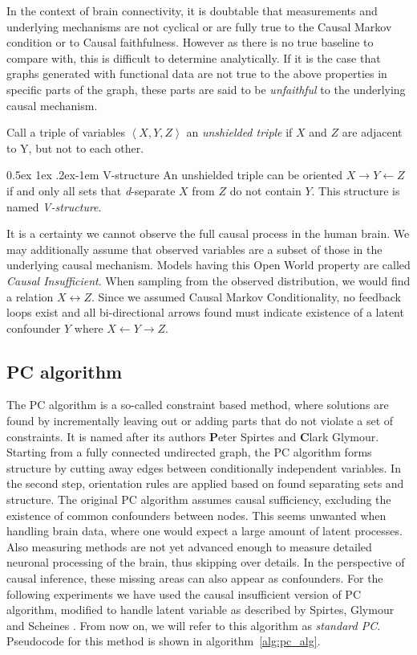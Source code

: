 \documentclass[a4paper, 10pt, english, onecolumn]{article}
\makeatletter
\renewcommand{\paragraph}{%
  \@startsection{paragraph}{4}%
  {\z@}{0.5ex \@plus 1ex \@minus .2ex}{-1em}%
  {\normalfont\normalsize\bfseries}%
}
\makeatother
\begin{document}
In the context of brain connectivity, it is doubtable that measurements and underlying mechanisms are not cyclical or are fully true to the Causal Markov condition or to Causal faithfulness.
However as there is no true baseline to compare with, this is difficult to determine analytically.
If it is the case that graphs generated with functional data are not true to the above properties in specific parts of the graph, these parts are said to be \textit{unfaithful} to the underlying causal mechanism.

Call a triple of variables $\left < X,Y,Z \right >$ an \textit{unshielded triple} if $X$ and $Z$ are adjacent to Y, but not to each other.

\paragraph{V-structure}
An unshielded triple can be oriented $X \rightarrow Y \leftarrow Z$ if and only all sets that \textit{d}-separate $X$ from $Z$ do not contain $Y$.
This structure is named \textit{V-structure}.

It is a certainty we cannot observe the full causal process in the human brain.
We may additionally assume that observed variables are a subset of those in the underlying causal mechanism.
Models having this Open World property are called \textit{Causal Insufficient}.
When sampling from the observed distribution, we would find a relation $X \leftrightarrow Z$.
Since we assumed Causal Markov Conditionality, no feedback loops exist and all bi-directional arrows found must indicate existence of a latent confounder $Y$ where $X \leftarrow Y \rightarrow Z$.

\subsection{PC algorithm}
The PC algorithm is a so-called constraint based method, where solutions are found by incrementally leaving out or adding parts that do not violate a set of constraints.
It is named after its authors \textbf{P}eter Spirtes and \textbf{C}lark Glymour.
Starting from a fully connected undirected graph, the PC algorithm forms structure by cutting away edges between conditionally independent variables.
In the second step, orientation rules are applied based on found separating sets and structure.
The original PC algorithm assumes causal sufficiency, excluding the existence of common confounders between nodes.
This seems unwanted when handling brain data, where one would expect a large amount of latent processes.
Also measuring methods are not yet advanced enough to measure detailed neuronal processing of the brain, thus skipping over details.
In the perspective of causal inference, these missing areas can also appear as confounders.
For the following experiments we have used the causal insufficient version of PC algorithm, modified to handle latent variable as described by Spirtes, Glymour and Scheines \cite[p.165-167]{spirtes2000}.
From now on, we will refer to this algorithm as \textit{standard PC}.
Pseudocode for this method is shown in algorithm~\ref{alg:pc_alg}.
\end{document}
